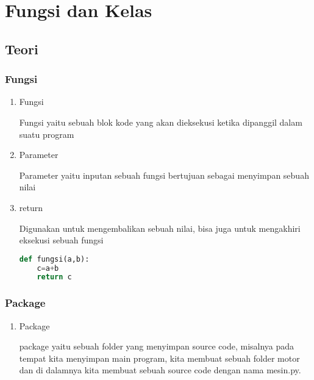 \chapter{Fungsi dan Kelas}

\section{Teori}
\subsection{Fungsi}
\begin{enumerate}
\item Fungsi 
\par 
Fungsi yaitu sebuah blok kode yang akan dieksekusi ketika dipanggil dalam suatu program
\item Parameter 
\par 
Parameter yaitu inputan sebuah fungsi bertujuan sebagai menyimpan sebuah nilai
\item return 
\par 
Digunakan untuk mengembalikan sebuah nilai, bisa juga untuk mengakhiri eksekusi sebuah fungsi
\begin{lstlisting}[language=Python]
def fungsi(a,b):
	c=a+b
	return c
\end{lstlisting}
\end{enumerate}

\subsection{Package}
\begin{enumerate}
\item Package
\par 
package yaitu sebuah folder yang menyimpan source code, misalnya pada tempat kita menyimpan main program, kita membuat sebuah folder motor dan di dalamnya kita membuat sebuah source code dengan nama mesin.py.

\end{enumerate}

